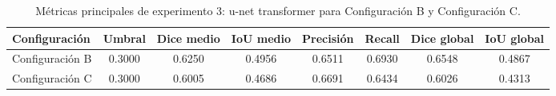 \begin{table}[H]
    \centering
    \small
    \caption{Métricas principales de experimento 3: u-net transformer para Configuración B y Configuración C.}
    \label{tab:experimento03unettransformer_metricas_principales}
    \begin{tabular}{lccccccc}
        \toprule
        Configuración & Umbral & Dice medio & IoU medio & Precisión & Recall & Dice global & IoU global \\
        \midrule
        Configuración B & 0.3000 & 0.6250 & 0.4956 & 0.6511 & 0.6930 & 0.6548 & 0.4867 \\
        Configuración C & 0.3000 & 0.6005 & 0.4686 & 0.6691 & 0.6434 & 0.6026 & 0.4313 \\
        \bottomrule
    \end{tabular}
\end{table}
